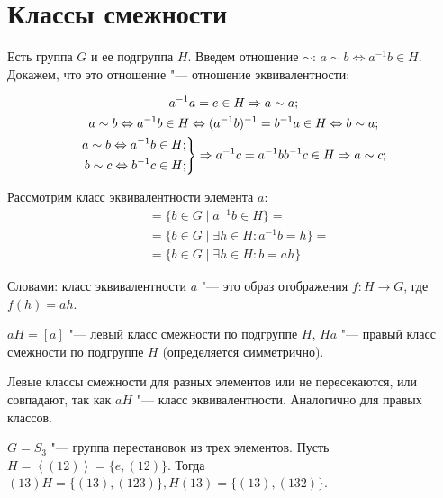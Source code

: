 \section{Классы смежности}

Есть группа $G$ и ее подгруппа $H$. Введем отношение $\sim$: $a\sim b \iff a^{-1}b \in H$.
Докажем, что это отношение "--- отношение эквивалентности:

\begin{gather*}
a^{-1}a = e \in H \Rightarrow a \sim a; \\
a \sim b \Leftrightarrow a^{-1}b \in H \Leftrightarrow (a^{-1}b)^{-1} = b^{-1}a \in H \Leftrightarrow b \sim a; \\
\left.
\begin{align*}
  a \sim b \Leftrightarrow a^{-1}b \in H; \\
  b \sim c \Leftrightarrow b^{-1}c \in H; 
\end{align*}
\right\} \Rightarrow a^{-1}c = a^{-1}bb^{-1}c \in H \Rightarrow a \sim c;
\end{gather*}

Рассмотрим класс эквивалентности элемента $a$:
\begin{align*}
[a] &= \{b \in G \mid a^{-1}b \in H\} = \\
    &= \{b \in G \mid \exists h \in H \colon a^{-1}b = h\} = \\
    &= \{b \in G \mid \exists h \in H \colon b = ah\}
\end{align*}

Словами: класс эквивалентности $a$ "--- это образ отображения $f: H \to G$, где $f(h)=ah$.

\begin{Def}
	$aH = [a]$ "--- левый класс смежности по подгруппе $H$, $Ha$ "--- правый класс смежности по подгруппе $H$ (определяется симметрично).
\end{Def}
\begin{Rem}
	Левые классы смежности для разных элементов или не пересекаются, или совпадают, так как $aH$ "--- класс эквивалентности. Аналогично для
	правых классов.
\end{Rem}

\begin{exmp}
$G = S_3$ "--- группа перестановок из трех элементов. Пусть $H = \left<(12)\right> = \{e, (12)\}$.
Тогда $(13)H = \{(13), (123)\}, H(13) = \{(13), (132)\}$.
\end{exmp}
